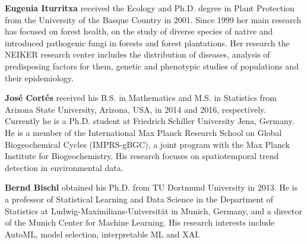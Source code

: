 \documentclass[remotesensing,article,submit,moreauthors,pdftex]{Definitions/mdpi}
\begin{document}
\bio
{}
{\textbf{Eugenia Iturritxa} received the Ecology and Ph.D. degree in Plant Protection from the University of the Basque Country in 2001.
	Since 1999 her main research has focused on forest health, on the study of diverse species of native and introduced pathogenic fungi in forests and forest plantations.
	Her research the NEIKER research center includes the distribution of diseases, analysis of predisposing factors for them, genetic and phenotypic studies of populations and their epidemiology.}

\bio
{}
{\textbf{José Cortés} received his B.S. in Mathematics and M.S. in Statistics from Arizona State University, Arizona, USA, in 2014 and 2016, respectively.
	Currently he is a Ph.D. student at Friedrich Schiller University Jena, Germany.
	He is a member of the International Max Planck Research School on Global Biogeochemical Cycles (IMPRS-gBGC), a joint program with the Max Planck Institute for Biogeochemistry.
	His research focuses on spatiotemporal trend detection in environmental data.}

\bio
{}
{\textbf{Bernd Bischl} obtained his Ph.D. from TU Dortmund University in 2013.
	He is a professor of Statistical Learning and Data Science in the Department of Statistics at Ludwig-Maximilians-Universität in Munich, Germany, and a director of the Munich Center for Machine Learning.
	His research interests include AutoML, model selection, interpretable ML and XAI.}
\end{document}

